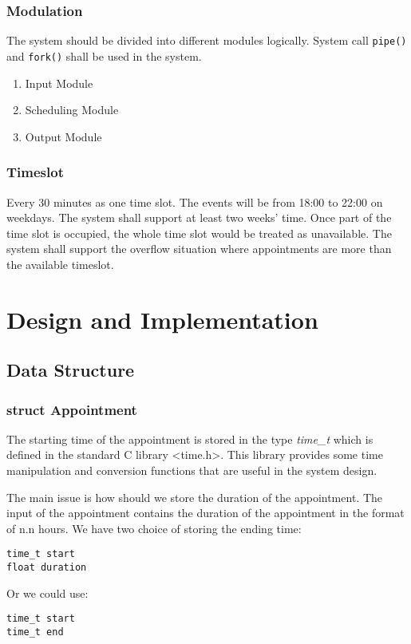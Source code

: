 \documentclass[12pt,a4paper]{report}
\begin{document}
\subsection{Modulation}
The system should be divided into different modules logically. System call \texttt{pipe()} and \texttt{fork()} shall be used in the system.
\begin{enumerate}
\item Input Module
\item Scheduling Module
\item Output Module
\end{enumerate}

\subsection{Timeslot}
Every 30 minutes as one time slot. The events will be from 18:00 to 22:00 on weekdays. The system shall support at least two weeks' time. Once part of the time slot is occupied, the whole time slot would be treated as unavailable. The system shall support the overflow situation where appointments are more than the available timeslot.

\chapter{Design and Implementation}
\section{Data Structure}
\subsection{struct Appointment}
The starting time of the appointment is stored in the type \textit{time\_t} which is defined in the standard C library \textless time.h\textgreater. This library provides some time manipulation and conversion functions that are useful in the system design.

The main issue is how should we store the duration of the appointment. The input of the appointment contains the duration of the appointment in the format of n.n hours. We have two choice of storing the ending time:
\begin{lstlisting}
time_t start
float duration
\end{lstlisting}
Or we could use:
\begin{lstlisting}
time_t start
time_t end
\end{lstlisting}
\end{document}
